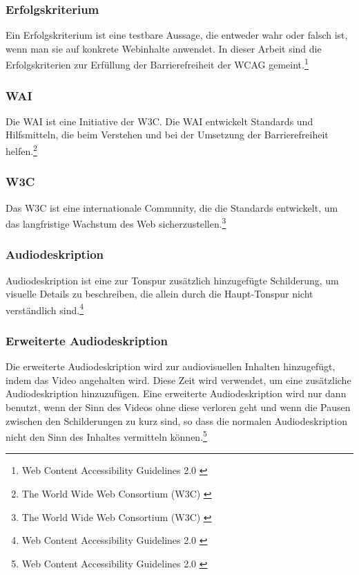 \subsubsection{Erfolgskriterium}
Ein Erfolgskriterium ist eine testbare Aussage, die entweder wahr oder falsch ist, wenn man sie auf konkrete Webinhalte anwendet. In dieser
Arbeit sind die Erfolgskriterien zur Erfüllung der Barrierefreiheit der \ac{WCAG} gemeint.\footnote{Web Content Accessibility Guidelines 2.0 \cite{WCAG2.0}}

\subsubsection{\ac{WAI}}
Die \ac{WAI} ist eine Initiative der \ac{W3C}. Die \ac{WAI} entwickelt Standards und Hilfsmitteln, die beim Verstehen und bei der Umsetzung 
der Barrierefreiheit helfen.\footnote{The World Wide Web Consortium (W3C) \cite{w3c}}

\subsubsection{\ac{W3C}}
Das \ac{W3C} ist eine internationale Community, die die Standards entwickelt, um das langfristige Wachstum des Web 
sicherzustellen.\footnote{The World Wide Web Consortium (W3C) \cite{w3c}}

\subsubsection{Audiodeskription}
Audiodeskription ist eine zur Tonspur zusätzlich hinzugefügte Schilderung, um visuelle Details zu beschreiben, die allein durch die Haupt-Tonspur 
nicht verständlich sind.\footnote{Web Content Accessibility Guidelines 2.0 \cite{WCAG2.0}}

\subsubsection{Erweiterte Audiodeskription}
Die erweiterte Audiodeskription wird zur audiovisuellen Inhalten hinzugefügt, indem das Video angehalten wird. Diese Zeit wird verwendet, 
um eine zusätzliche Audiodeskription hinzuzufügen. Eine erweiterte Audiodeskription wird nur dann benutzt, wenn der Sinn des Videos ohne diese verloren geht und wenn 
die Pausen zwischen den Schilderungen zu kurz sind, so dass die normalen Audiodeskription nicht den Sinn des Inhaltes vermitteln 
können.\footnote{Web Content Accessibility Guidelines 2.0 \cite{WCAG2.0}}

